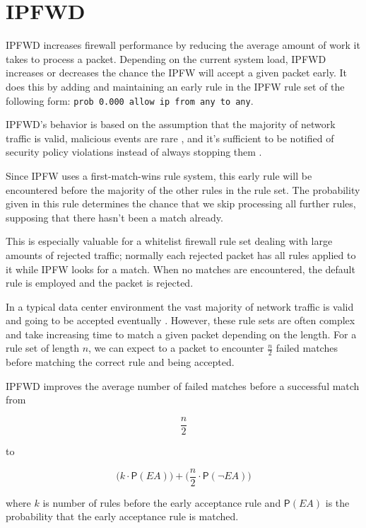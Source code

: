 \documentclass[journal]{IEEEtran}
\begin{document}
\section{IPFWD}

  IPFWD increases firewall performance by reducing the average amount of work
  it takes to process a packet. Depending on the current system load, IPFWD
  increases or decreases the chance the IPFW will accept a given packet early.
  It does this by adding and maintaining an early rule in the IPFW rule set of
  the following form: \verb|prob 0.000 allow ip from any to any|. 

  IPFWD's behavior is based on the assumption that the majority of network
  traffic is valid, malicious events are rare \cite{networktrafficanalysis},
  and it's sufficient to be notified of security policy violations instead of
  always stopping them \cite{TODO}.

  Since IPFW uses a first-match-wins rule system, this early rule will be
  encountered before the majority of the other rules in the rule set.  The
  probability given in this rule determines the chance that we skip processing
  all further rules, supposing that there hasn't been a match already.  

  This is especially valuable for a whitelist firewall rule set dealing with
  large amounts of rejected traffic; normally each rejected packet has all
  rules applied to it while IPFW looks for a match.  When no matches are
  encountered, the default rule is employed and the packet is rejected. 

  In a typical data center environment the vast majority of network traffic is
  valid and going to be accepted eventually \cite{TODO}. However, these rule
  sets are often complex and take increasing time to match a given packet
  depending on the length. For a rule set of length $n$, we can expect to a
  packet to encounter $\frac{n}{2}$ failed matches before matching the correct
  rule and being accepted.

  IPFWD improves the average number of failed matches before a successful match
  from

  \[
  \frac{n}{2}
  \]

  to

  \[
  \Big(k \cdot \mathsf{P}(\textit{EA})\Big) + 
  \Big(\frac{n}{2} \cdot \mathsf{P}(\neg{\textit{EA}})\Big) 
  \]

  where $k$ is number of rules before the early acceptance rule and
  $\mathsf{P}(\textit{EA})$ is the probability that the early acceptance rule
  is matched.
\end{document}
